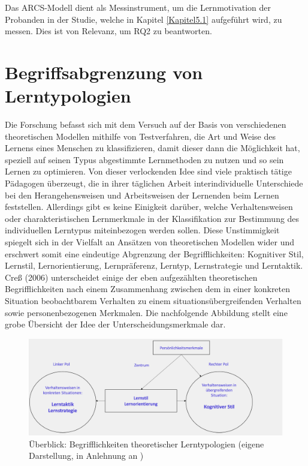         Das ARCS-Modell dient als Messinstrument, um die Lernmotivation der Probanden in der Studie, welche in Kapitel \ref{Kapitel5.1} aufgeführt wird, zu messen.
        Dies ist von Relevanz, um RQ2 zu beantworten.

    \section{Begriffsabgrenzung von Lerntypologien} \label{Begriffsabgenzung}
    Die Forschung befasst sich mit dem Versuch auf der Basis von verschiedenen theoretischen Modellen mithilfe von Testverfahren, die Art und Weise des Lernens eines Menschen zu klassifizieren, damit dieser dann die Möglichkeit hat, speziell auf seinen Typus
    abgestimmte Lernmethoden zu nutzen und so sein Lernen zu optimieren. Von dieser verlockenden Idee sind viele praktisch tätige Pädagogen überzeugt, die in ihrer täglichen Arbeit interindividuelle Unterschiede bei den Herangehensweisen 
    und Arbeitsweisen der Lernenden beim Lernen feststellen. \parencite[13f.]{Martin.2012}
    Allerdings gibt es keine Einigkeit darüber, welche Verhaltensweisen oder charakteristischen Lernmerkmale in der Klassifikation zur Bestimmung des individuellen Lerntypus miteinbezogen werden sollen. Diese Unstimmigkeit spiegelt sich 
    in der Vielfalt an Ansätzen von theoretischen Modellen  wider und erschwert somit eine eindeutige Abgrenzung der Begrifflichkeiten: Kognitiver Stil, Lernstil, Lernorientierung, Lernpräferenz,
    Lerntyp, Lernstrategie und Lerntaktik. \parencite[9]{Zeiter.2011} \parencite[365]{Cress.2006}
    Creß (2006) unterscheidet einige der eben aufgezählten theoretischen Begrifflichkeiten nach einem Zusammenhang zwischen dem in einer konkreten Situation beobachtbarem Verhalten 
    zu einem situationsübergreifenden Verhalten sowie personenbezogenen Merkmalen. \parencite[365]{Cress.2006} 
    Die nachfolgende Abbildung stellt eine grobe Übersicht der Idee der Unterscheidungsmerkmale dar.
    
    \begin{figure}[H]
        \centering
        \includegraphics[width=0.8\linewidth]{images/AbgrenzungTheoretischerKonzepte.png}
        \caption[Überblick: Begrifflichkeiten theoretischer Lerntypologien]{Überblick: Begrifflichkeiten theoretischer Lerntypologien (eigene Darstellung, in Anlehnung an \parencite[11]{Zeiter.2011})}
        \label{fig:Überblick Begrifflichkeiten theoretischer Modelle}
    \end{figure}

